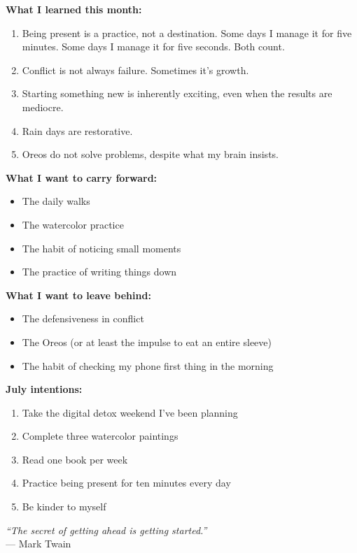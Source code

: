 \documentclass[
    language=english,
    doctype=journal,
    institution=none,
]{../../omnilatex}
\begin{document}
\textbf{What I learned this month:}
\begin{enumerate}
    \item Being present is a practice, not a destination. Some days I manage it for five minutes. Some days I manage it for five seconds. Both count.
    \item Conflict is not always failure. Sometimes it's growth.
    \item Starting something new is inherently exciting, even when the results are mediocre.
    \item Rain days are restorative.
    \item Oreos do not solve problems, despite what my brain insists.
\end{enumerate}

\textbf{What I want to carry forward:}
\begin{itemize}
    \item The daily walks
    \item The watercolor practice
    \item The habit of noticing small moments
    \item The practice of writing things down
\end{itemize}

\textbf{What I want to leave behind:}
\begin{itemize}
    \item The defensiveness in conflict
    \item The Oreos (or at least the impulse to eat an entire sleeve)
    \item The habit of checking my phone first thing in the morning
\end{itemize}

\textbf{July intentions:}
\begin{enumerate}
    \item Take the digital detox weekend I've been planning
    \item Complete three watercolor paintings
    \item Read one book per week
    \item Practice being present for ten minutes every day
    \item Be kinder to myself
\end{enumerate}

\vspace{1cm}

\begin{center}
\textit{``The secret of getting ahead is getting started.''}\\
--- Mark Twain
\end{center}
\end{document}
